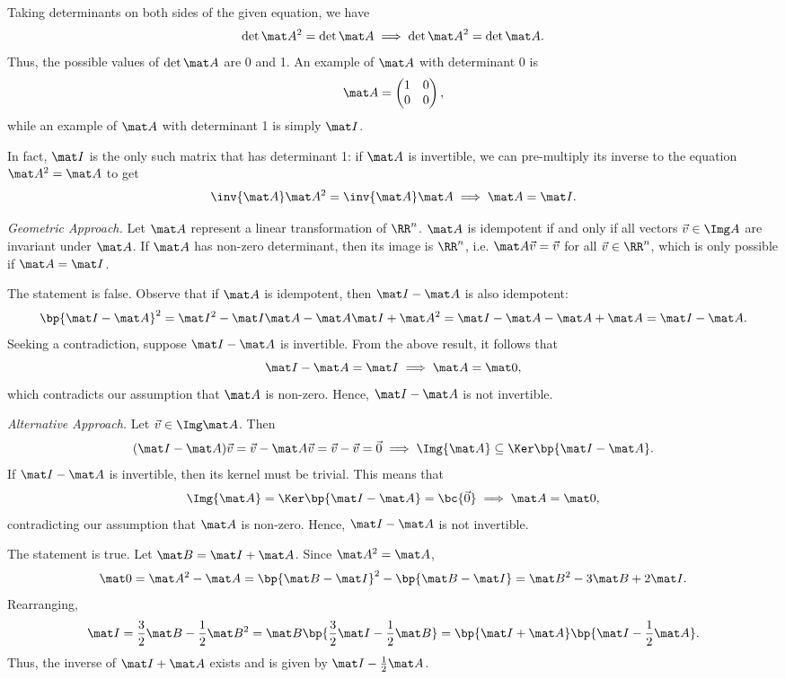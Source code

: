 \begin{solution}
    \begin{ppart}
        Taking determinants on both sides of the given equation, we have \[\det{\mat A^2} = \det{\mat A} \implies \det{\mat A}^2 = \det{\mat A}.\] Thus, the possible values of $\det{\mat A}$ are 0 and 1. An example of $\mat A$ with determinant 0 is \[\mat A = \begin{pmatrix}1 & 0 \\ 0 & 0\end{pmatrix},\] while an example of $\mat A$ with determinant 1 is simply $\mat I$.

        In fact, $\mat I$ is the only such matrix that has determinant 1: if $\mat A$ is invertible, we can pre-multiply its inverse to the equation $\mat A^2 = \mat A$ to get \[\inv{\mat A} \mat A^2 = \inv{\mat A} \mat A \implies \mat A = \mat I.\]
        
        \noindent\textit{Geometric Approach.} Let $\mat A$ represent a linear transformation of $\RR^n$. $\mat A$ is idempotent if and only if all vectors $\vec v \in \Img A$ are invariant under $\mat A$. If $\mat A$ has non-zero determinant, then its image is $\RR^n$, i.e. $\mat A \vec v = \vec v$ for all $\vec v \in \RR^n$, which is only possible if $\mat A = \mat I$.

        \begin{psubpart}
            The statement is false. Observe that if $\mat A$ is idempotent, then $\mat I - \mat A$ is also idempotent: \[\bp{\mat I - \mat A}^2 = \mat I^2 - \mat I \mat A - \mat A \mat I + \mat A^2 = \mat I - \mat A - \mat A + \mat A = \mat I - \mat A.\] Seeking a contradiction, suppose $\mat I - \mat A$ is invertible. From the above result, it follows that \[\mat I - \mat A = \mat I \implies \mat A = \mat 0,\] which contradicts our assumption that $\mat A$ is non-zero. Hence, $\mat I - \mat A$ is not invertible.

            \noindent\textit{Alternative Approach.} Let $\vec v \in \Img \mat A$. Then \[(\mat I - \mat A) \vec v = \vec v - \mat A \vec v = \vec v - \vec v = \vec 0 \implies \Img{\mat A} \subseteq \Ker \bp{\mat I - \mat A}.\] If $\mat I - \mat A$ is invertible, then its kernel must be trivial. This means that \[\Img{\mat A} = \Ker \bp{\mat I - \mat A} = \bc{\vec 0} \implies \mat A = \mat 0,\] contradicting our assumption that $\mat A$ is non-zero. Hence, $\mat I - \mat A$ is not invertible.
        \end{psubpart}
        \begin{psubpart}
            The statement is true. Let $\mat B = \mat I + \mat A$. Since $\mat A^2 = \mat A$, \[\mat 0 = \mat A^2 - \mat A = \bp{\mat B - \mat I}^2 - \bp{\mat B - \mat I} = \mat B^2 - 3\mat B + 2 \mat I.\] Rearranging, \[\mat I = \frac32 \mat B - \frac12 \mat B^2 = \mat B \bp{\frac32 \mat I - \frac12 \mat B} = \bp{\mat I + \mat A} \bp{\mat I - \frac12 \mat A}.\] Thus, the inverse of $\mat I + \mat A$ exists and is given by $\mat I - \frac12 \mat A$.
            

\end{psubpart}
\end{ppart}
\end{solution}
